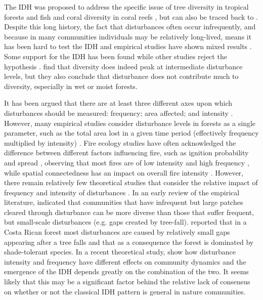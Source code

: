 The IDH was proposed to address the specific issue of tree diversity in tropical forests and fish and coral diversity in coral reefs \citep{connell1978diversity}, but can also be traced back to \cite{grime1973competitive}. Despite this long history, the fact that disturbances often occur infrequently, and because in many communities individuals may be relatively long-lived, means it has been hard to test the IDH and empirical studies have shown mixed results \citep[see review in ][]{mackey2001diversity}. Some support for the IDH has been found \citep[e.g.][]{biswas2010disturbance,molino2001tree,rogers1993hurricanes} while other studies reject the hypothesis \citep[e.g.][]{hubbell1999light,huxham2000field}. \cite{bongers2009intermediate} find that diversity does indeed peak at intermediate disturbance levels, but they also conclude that disturbance does not contribute much to diversity, especially in wet or moist forests.

It has been argued that there are at least three different axes upon which disturbances should be measured: frequency; area affected; and intensity \citep{malanson1984intensity,miller1982community,sousa1984role}.  However, many empirical studies consider disturbance levels in forests as a single parameter, such as the total area lost in a given time period (effectively frequency multiplied by intensity) \citep[e.g.][]{molino2001tree,nakagawa2000impact,peterson1997tornado}. Fire ecology studies have often acknowledged the difference between different factors influencing fire, such as ignition probability and spread \citep[e.g.][]{kilgore1979fire,turner1994landscape}, observing that most fires are of low intensity and high frequency \citep{kilgore1979fire}, while spatial connectedness has an impact on overall fire intensity \citep{turner1994landscape}. However, there remain relatively few theoretical studies that consider the relative impact of frequency and intensity of disturbances \citep[but see ][]{miller2011frequency}. In an early review of the empirical literature, \cite{denslow1980patterns} indicated that communities that have infrequent but large patches cleared through disturbance can be more diverse than those that suffer frequent, but small-scale disturbances (e.g. gaps created by tree-fall). \cite{hartshorn1978treefalls} reported that in a Costa Rican forest most disturbances are caused by relatively small gaps appearing after a tree falls and that as a consequence the forest is dominated by shade-tolerant species. In a recent theoretical study, \cite{miller2011frequency} show how disturbance intensity and frequency have different effects on community dynamics and the emergence of the IDH depends greatly on the combination of the two. It seems likely that this may be a significant factor behind the relative lack of consensus on whether or not the classical IDH pattern is general in nature communities.

